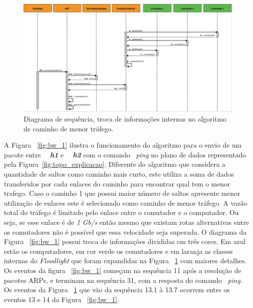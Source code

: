 \begin{figure}[!htb]
	\caption{\label{fig:bw_2}Diagrama de sequência, troca de informações internas no algoritmo de caminho de menor tráfego.}
	\begin{center}
	    \includegraphics[scale=0.445]{imagens/bw.2.jpg}
	\end{center}
\end{figure}
A Figura ~\ref{fig:bw_1} ilustra o funcionamento do algoritmo para o envio de um pacote entre ~\textit{~\textbf{h1}} e ~\textit{~\textbf{h2}} com o comando ~\textit{ping} no plano de dados representado pela Figura~\ref{fig:topo_explicacao}. Diferente do algoritmo que considera a quantidade de saltos como caminho mais curto, este utiliza a soma de dados transferidos por cada enlaces do caminho para encontrar qual tem o menor trafego. Caso o caminho 1 que possui maior número de saltos apresente menor utilização de enlaces este é selecionado como caminho de menor tráfego. A vazão total do tráfego é limitado pelo enlace entre o comutador e o computador. Ou seja, se esse enlace é de \textit{1 Gb/s} então mesmo que existam rotas alternativas entre os comutadores não é possível que essa velocidade seja superada.   
O diagrama da Figura ~\ref{fig:bw_1} possui troca de informações divididas em três cores. Em azul estão os computadores, em cor verde os comutadores e em laranja as classes internas do \textit{Floodlight} que foram expandidas na Figura ~\ref{fig:bw_2} com maiores detalhes. Os eventos da figura ~\ref{fig:bw_1} começam na sequência 11 após a resolução de pacotes ARPs, e terminam na sequência 31, com a resposta do comando ~\textit{ping}. Os eventos da Figura ~\ref{fig:bw_2} que vão da sequência 13.1 à 13.7 ocorrem entre os eventos 13 e 14 da Figura ~\ref{fig:bw_1}. 



